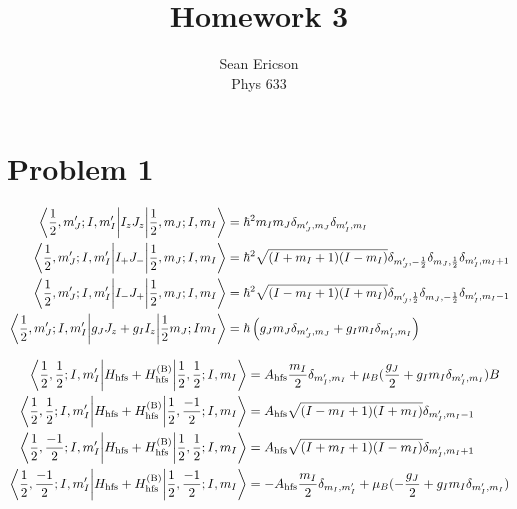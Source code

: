 \documentclass[12pt]{article}
\newcommand{\ahfs}{A_\text{hfs}}
\newcommand{\hhfs}{H_\text{hfs}}
\newcommand{\hhfsb}{H_\text{hfs}^{(\text{B})}}
\begin{document}
	
\title{Homework 3}
\author{Sean Ericson \\ Phys 633}
\maketitle

\section*{Problem 1}
\begin{align*}
    \mel{\frac{1}{2}, m_J'; I, m_I'}{I_zJ_z}{\frac{1}{2}, m_J; I, m_I} &= \hbar^2 m_I m_J \delta_{m_J',m_J} \delta_{m_I',m_I} \\
    \mel{\frac{1}{2}, m_J'; I, m_I'}{I_+ J_-}{\frac{1}{2}, m_J; I, m_I} &= \hbar^2 \sqrt{(I + m_I +1)(I - m_I)}\delta_{m_J',-\frac{1}{2}}\delta_{m_J,\frac{1}{2}}\delta_{m_I',m_I+1} \\
    \mel{\frac{1}{2}, m_J'; I, m_I'}{I_- J_+}{\frac{1}{2}, m_J; I, m_I} &= \hbar^2 \sqrt{(I - m_I +1)(I + m_I)}\delta_{m_J',\frac{1}{2}}\delta_{m_J,-\frac{1}{2}}\delta_{m_I',m_I-1} \\
    \mel{\frac{1}{2}, m_J'; I, m_I'}{g_JJ_z + g_II_z}{\frac{1}{2} m_J; I m_I} &= \hbar \left(g_Jm_J\delta_{m_J',m_J} + g_Im_I\delta_{m_I',m_I}\right)
\end{align*}

\begin{align*}
    \mel{\frac{1}{2},\frac{1}{2};I, m_I'}{\hhfs + \hhfsb}{\frac{1}{2},\frac{1}{2};I, m_I} &= \ahfs \frac{m_I}{2}\delta_{m_I',m_I} + \mu_B(\frac{g_J}{2} + g_Im_I\delta_{m_I',m_I})B \\
    \mel{\frac{1}{2},\frac{1}{2};I, m_I'}{\hhfs + \hhfsb}{\frac{1}{2},\frac{-1}{2};I, m_I} &= \ahfs \sqrt{(I-m_I+1)(I+m_I)}\delta_{m_I',m_I-1} \\
    \mel{\frac{1}{2},\frac{-1}{2};I, m_I'}{\hhfs + \hhfsb}{\frac{1}{2},\frac{1}{2};I, m_I} &= \ahfs \sqrt{(I+m_I+1)(I-m_I)}\delta_{m_I',m_I+1} \\
    \mel{\frac{1}{2},\frac{-1}{2};I, m_I'}{\hhfs + \hhfsb}{\frac{1}{2},\frac{-1}{2};I, m_I} &= -\ahfs \frac{m_I}{2}\delta_{m_I,m_I'} + \mu_B(-\frac{g_J}{2} + g_Im_I\delta_{m_I',m_I})
\end{align*}
\end{document}
